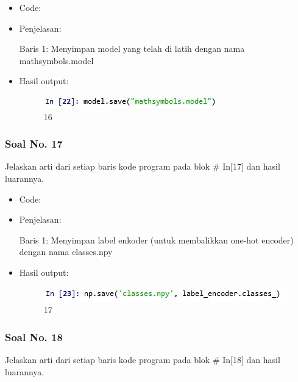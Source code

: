 \begin{itemize}
\item Code:


\item Penjelasan:

Baris 1: Menyimpan model yang telah di latih dengan nama mathsymbols.model

\item Hasil output:

\begin{figure}[!hbtp]
\centering
\includegraphics[scale=0.7]{figures/1174050/chapter7/26.jpg}
\caption{16}
\end{figure}

\end{itemize}

\subsubsection{Soal No. 17}
Jelaskan arti dari setiap baris kode program pada blok \# In[17] dan hasil luarannya.

\begin{itemize}
\item Code:


\item Penjelasan:

Baris 1: Menyimpan label enkoder (untuk membalikkan one-hot encoder) dengan nama classes.npy

\item Hasil output:

\begin{figure}[!hbtp]
\centering
\includegraphics[scale=0.7]{figures/1174050/chapter7/27.jpg}
\caption{17}
\end{figure}

\end{itemize}

\subsubsection{Soal No. 18}
Jelaskan arti dari setiap baris kode program pada blok \# In[18] dan hasil luarannya.

